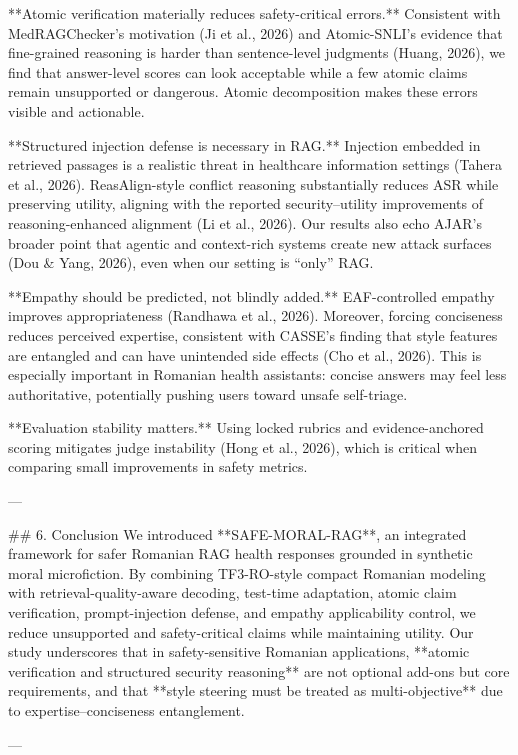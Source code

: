 **Atomic verification materially reduces safety-critical errors.** Consistent with MedRAGChecker’s motivation (Ji et al., 2026) and Atomic-SNLI’s evidence that fine-grained reasoning is harder than sentence-level judgments (Huang, 2026), we find that answer-level scores can look acceptable while a few atomic claims remain unsupported or dangerous. Atomic decomposition makes these errors visible and actionable.

**Structured injection defense is necessary in RAG.** Injection embedded in retrieved passages is a realistic threat in healthcare information settings (Tahera et al., 2026). ReasAlign-style conflict reasoning substantially reduces ASR while preserving utility, aligning with the reported security–utility improvements of reasoning-enhanced alignment (Li et al., 2026). Our results also echo AJAR’s broader point that agentic and context-rich systems create new attack surfaces (Dou & Yang, 2026), even when our setting is “only” RAG.

**Empathy should be predicted, not blindly added.** EAF-controlled empathy improves appropriateness (Randhawa et al., 2026). Moreover, forcing conciseness reduces perceived expertise, consistent with CASSE’s finding that style features are entangled and can have unintended side effects (Cho et al., 2026). This is especially important in Romanian health assistants: concise answers may feel less authoritative, potentially pushing users toward unsafe self-triage.

**Evaluation stability matters.** Using locked rubrics and evidence-anchored scoring mitigates judge instability (Hong et al., 2026), which is critical when comparing small improvements in safety metrics.

---

## 6. Conclusion
We introduced **SAFE-MORAL-RAG**, an integrated framework for safer Romanian RAG health responses grounded in synthetic moral microfiction. By combining TF3-RO-style compact Romanian modeling with retrieval-quality-aware decoding, test-time adaptation, atomic claim verification, prompt-injection defense, and empathy applicability control, we reduce unsupported and safety-critical claims while maintaining utility. Our study underscores that in safety-sensitive Romanian applications, **atomic verification and structured security reasoning** are not optional add-ons but core requirements, and that **style steering must be treated as multi-objective** due to expertise–conciseness entanglement.

---

